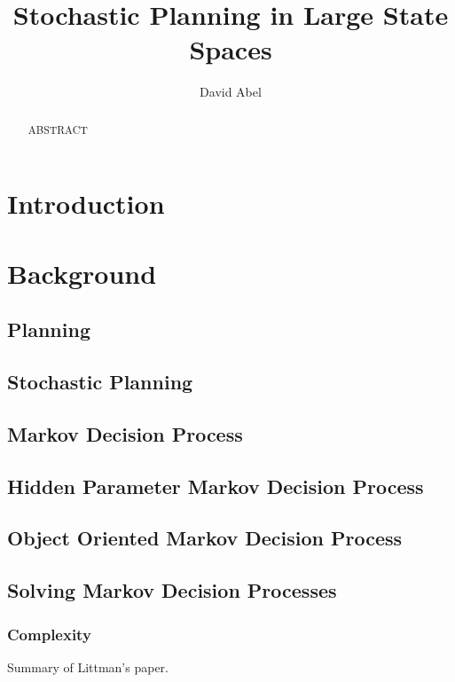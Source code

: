 \documentclass[11pt]{article}
\title{Stochastic Planning in Large State Spaces}
\author{David Abel}
\date{}
\begin{document}
\maketitle

\newpage

\tableofcontents

\newpage

\begin{abstract}
ABSTRACT
\end{abstract}

\newpage

\section{Introduction}

\section{Background}

\subsection{Planning}

\subsection{Stochastic Planning}

\subsection{Markov Decision Process}

\subsection{Hidden Parameter Markov Decision Process}

\subsection{Object Oriented Markov Decision Process}

\subsection{Solving Markov Decision Processes}

\subsubsection{Complexity}
Summary of Littman's paper.
\end{document}
